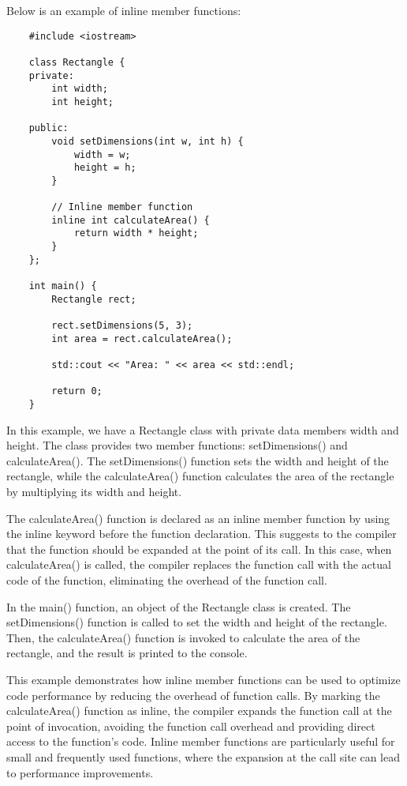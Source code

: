 \begin{solution}
    Below is an example of inline member functions: \\
    \horizontalline
    \begin{verbatim}
    #include <iostream>

    class Rectangle {
    private:
        int width;
        int height;
        
    public:
        void setDimensions(int w, int h) {
            width = w;
            height = h;
        }
        
        // Inline member function
        inline int calculateArea() {
            return width * height;
        }
    };
    
    int main() {
        Rectangle rect;
        
        rect.setDimensions(5, 3);
        int area = rect.calculateArea();
        
        std::cout << "Area: " << area << std::endl;
        
        return 0;
    }        
    \end{verbatim}
    
    \horizontalline

    In this example, we have a Rectangle class with private data members width and height. The class provides two member functions: setDimensions() and calculateArea(). The setDimensions() function sets the width 
    and height of the rectangle, while the calculateArea() function calculates the area of the rectangle by multiplying its width and height.

    \noindent The calculateArea() function is declared as an inline member function by using the inline keyword before the function declaration. This suggests to the compiler that the function should be expanded 
    at the point of its call. In this case, when calculateArea() is called, the compiler replaces the function call with the actual code of the function, eliminating the overhead of the function call.

    \noindent In the main() function, an object of the Rectangle class is created. The setDimensions() function is called to set the width and height of the rectangle. Then, the calculateArea() function is invoked 
    to calculate the area of the rectangle, and the result is printed to the console.

    \noindent This example demonstrates how inline member functions can be used to optimize code performance by reducing the overhead of function calls. By marking the calculateArea() function as inline, the compiler 
    expands the function call at the point of invocation, avoiding the function call overhead and providing direct access to the function's code. Inline member functions are particularly useful for small and frequently 
    used functions, where the expansion at the call site can lead to performance improvements.
\end{solution}

